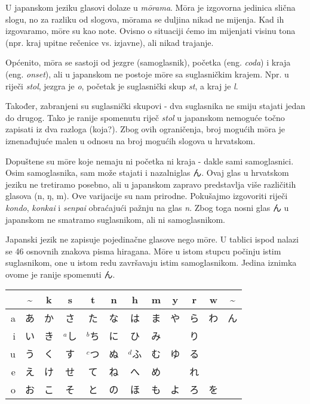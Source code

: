 
\author{autor}

	
	
	U japanskom jeziku glasovi dolaze u \textit{m\={o}rama}. M\={o}ra je izgovorna jedinica slična slogu, no za razliku od slogova, m\={o}rama se duljina nikad ne mijenja. Kad ih izgovaramo, m\={o}re su kao note. Ovisno o situaciji ćemo im mijenjati visinu tona (npr. kraj upitne rečenice vs. izjavne), ali nikad trajanje.
	
	Općenito, m\={o}ra se sastoji od jezgre (samoglasnik), početka (eng. \textit{coda}) i kraja (eng. \textit{onset}), ali u japanskom ne postoje m\={o}re sa suglasničkim krajem. Npr. u riječi \textit{stol}, jezgra je \textit{o}, početak je suglasnički skup \textit{st}, a kraj je \textit{l}.
	
	Također, zabranjeni su suglasnički skupovi - dva suglasnika ne smiju stajati jedan do drugog. Tako je ranije spomenutu riječ \textit{stol} u japanskom nemoguće točno zapisati iz dva razloga (koja?). Zbog ovih ograničenja, broj mogućih m\={o}ra je iznenađujuće malen u odnosu na broj mogućih slogova u hrvatskom.
	
	Dopuštene su m\={o}re koje nemaju ni početka ni kraja - dakle sami samoglasnici. Osim samoglasnika, sam može stajati i nazalni\footnotemark[1] glas ん. Ovaj glas u hrvatskom jeziku ne tretiramo posebno, ali u japanskom zapravo predstavlja više različitih glasova (n, ŋ, m). Ove varijacije su nam prirodne. Pokušajmo izgovoriti riječi \textit{kondo}, \textit{konkai} i \textit{senpai} obraćajući pažnju na glas \textit{n}. Zbog toga nosni glas ん u japanskom ne smatramo suglasnikom, ali ni samoglasnikom.
	
	
	
	Japanski jezik ne zapisuje pojedinačne glasove nego m\={o}re. U tablici ispod nalazi se 46 osnovnih znakova pisma hiragana. M\={o}re u istom stupcu počinju istim suglasnikom, one u istom redu završavaju istim samoglasnikom. Jedina iznimka ovome je ranije spomenuti ん.
	
	\setlength{\tabcolsep}{10pt}
	\vspace{10pt}
	\begin{tabular}{|r|c|c|c|c|c|c|c|c|c|c|c|}
		\hline
		&\textasciitilde&k&s&t&n&h&m&y&r&w&\textasciitilde\\
		\hline
		a&あ&か&さ&た&な&は&ま&や&ら&わ&ん\\
		i&い&き&$^a$し&$^b$ち&に&ひ&み&&り&&\\
		u&う&く&す&$^c$つ&ぬ&$^d$ふ&む&ゆ&る&&\\
		e&え&け&せ&て&ね&へ&め&&れ&&\\
		o&お&こ&そ&と&の&ほ&も&よ&ろ&を&\\
		\hline
	\end{tabular}
	
